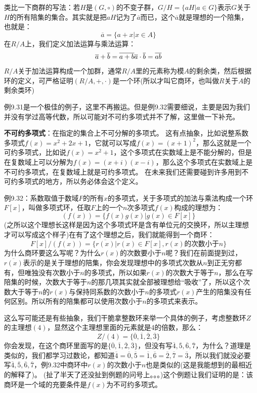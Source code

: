 \documentclass[12pt, a4paper, oneside]{ctexart}
\begin{document}
类比一下商群的写法：若$H$是$(G,\circ)$的不变子群，$G/H=\{aH|a\in G\}$表示$G$关于$H$的所有陪集的集合。其实就是把$aH$记为了$\overline{a}$而已，这个$\overline{a}$就是理想的一个陪集，也就是：
\[
\overline{a}=\{a+x|x\in A\}
\]
在$R/A$上，我们定义加法运算与乘法运算：
\[
\overline{a}+\overline{b}=\overline{a+b}\\
\overline{a}\cdot\overline{b}=\overline{ab}
\]
$R/A$关于加法运算构成一个加群，通常$R/A$里的元素称为模$A$的剩余类，然后根据环的定义，可严格证明$(R/A,+,\cdot)$是一个环(所以才叫它商环，也叫做$R$关于$A$的剩余类环)

例9.31是一个极佳的例子，这里不再搬运。但是例9.32需要细说，主要是因为我们并没有学过高等代数，所以可能对不可约多项式并不了解，这里做一下补充。

\textbf{不可约多项式}：在指定的集合上不可分解的多项式。
这有点抽象，比如说整系数多项式$f(x)=x^2+2x+1$，它就可以写成$f(x)=(x+1)^2$，那么这就是一个可约多项式，比如说$f(x)=x^2+1$，这个多项式在实数域上是不能分解的，但是在复数域上可以分解为$f(x)=(x+i)(x-i)$，那么这个多项式在实数域上是不可约多项式，在复数域上就是可约多项式。
在未来我们还需要碰到许多用到不可约多项式的地方，所以务必体会这个定义。

例9.32：系数取值于数域$F$的所有$x$的多项式，关于多项式的加法与乘法构成一个环$F[x]$，叫做多项式环，任取$F$上的一个$n$次多项式$f(x)$构成的理想为：
\[
(f(x))=\{f(x)g(x)|g(x)\in F[x]\}
\]
(之所以这个理想长这样是因为这个多项式环是含有单位元的交换环，所以主理想才可以写成这个样子)在有了这个理想之后，我们就能得到一个商环：
\[
F[x]/(f(x))=\{\overline{r(x)}|r(x)\in F[x],r(x)的次数小于n\}
\]
为什么商环要这么写呢？为什么$r(x)$的次数要小于$n$呢？我们在前面提到过，$\overline{r(x)}$表示的是关于理想的陪集，你会发现理想中的多项式次数从$n$到正无穷都有，但唯独没有次数小于$n$的多项式，所以如果$r(x)$的次数大于等于$n$，那么在写陪集的时候，次数大于等于$n$的那几项其实就全部被理想给“吸收”了，所以这个次数大于等于$n$的$r(x)$与保持同系数的次数小于$n$的多项式$r(x)$产生的陪集没有任何区别。所以所有的陪集都可以使用次数小于$n$的多项式来表示。

这么写可能还是有些抽象，我们干脆拿整数环来举一个具体的例子，考虑整数环$Z$的主理想$(4)$，显然这个主理想里面的元素就是4的倍数，那么：
\[
Z/(4)=\{\overline{0},\overline{1},\overline{2},\overline{3}\}
\]
你会发现，在这个商环里面写的是$\{\overline{0},\overline{1},\overline{2},\overline{3}\}$，但没有写$\overline{4},\overline{5},\overline{6},\overline{7}$，为什么？道理是类似的，我们都学习过数论，都知道$\overline{4}=\overline{0},\overline{5}=\overline{1},\overline{6}=\overline{2},\overline{7}=\overline{3}$，所以我们就没必要写$\overline{4},\overline{5},\overline{6},\overline{7}$，例9.32中商环中$r(x)$的次数小于$n$也是类似的(这是我能想到的最相近的解释了)。
(扯了半天了还没扯到例题的问号上。。。)这个例题让我们证明的是：该商环是一个域的充要条件是$f(x)$为不可约多项式。
\end{document}
